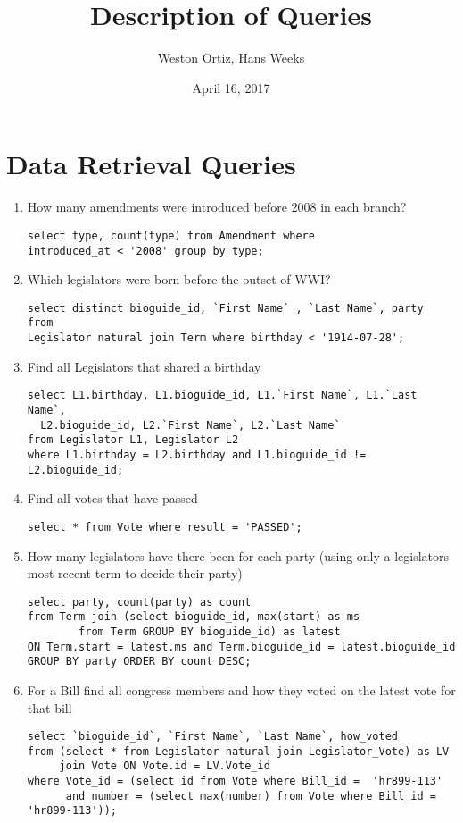 \documentclass[11pt]{article}
\author{Weston Ortiz, Hans Weeks}
\date{April 16, 2017}
\title{Description of Queries}
\begin{document}
\maketitle
\tableofcontents


\section{Data Retrieval Queries}
\label{sec-1}

\begin{enumerate}
\item How many amendments were introduced before 2008 in each branch?
\begin{verbatim}
select type, count(type) from Amendment where 
introduced_at < '2008' group by type;
\end{verbatim}

\item Which legislators were born before the outset of WWI?
\begin{verbatim}
select distinct bioguide_id, `First Name` , `Last Name`, party 
from
Legislator natural join Term where birthday < '1914-07-28';
\end{verbatim}

\item Find all Legislators that shared a birthday
\begin{verbatim}
select L1.birthday, L1.bioguide_id, L1.`First Name`, L1.`Last Name`,
  L2.bioguide_id, L2.`First Name`, L2.`Last Name` 
from Legislator L1, Legislator L2 
where L1.birthday = L2.birthday and L1.bioguide_id != L2.bioguide_id;
\end{verbatim}

\item Find all votes that have passed
\begin{verbatim}
select * from Vote where result = 'PASSED';
\end{verbatim}

\item How many legislators have there been for each party 
(using only a legislators most recent term to decide their party)
\begin{verbatim}
select party, count(party) as count 
from Term join (select bioguide_id, max(start) as ms 
		from Term GROUP BY bioguide_id) as latest 
ON Term.start = latest.ms and Term.bioguide_id = latest.bioguide_id 
GROUP BY party ORDER BY count DESC;
\end{verbatim}

\item For a Bill find all congress members and how they voted on the latest vote for that bill
\begin{verbatim}
select `bioguide_id`, `First Name`, `Last Name`, how_voted 
from (select * from Legislator natural join Legislator_Vote) as LV 
     join Vote ON Vote.id = LV.Vote_id 
where Vote_id = (select id from Vote where Bill_id =  'hr899-113' 
      and number = (select max(number) from Vote where Bill_id = 'hr899-113'));
\end{verbatim}


\end{enumerate}
\end{document}
